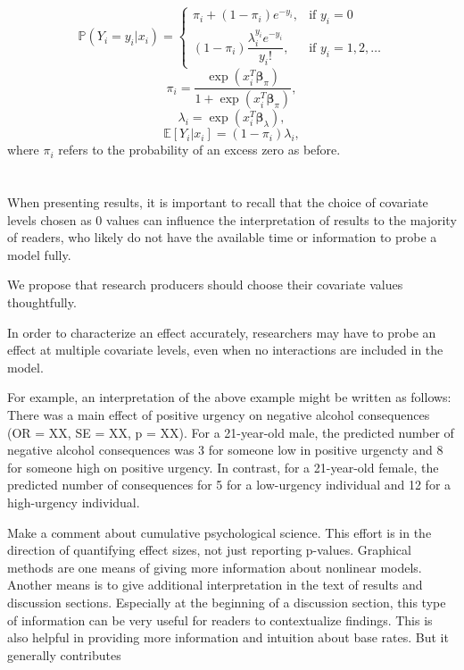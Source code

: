 \documentclass[jou, apacite]{apa6}
\begin{document}
\begin{equation} \label{zip1}
\mathbb{P}(Y_i = y_i|x_i) =
  \begin{cases}
    \pi_i + (1 - \pi_i)e^{-y_i}, & \text{if } y_i = 0 \\
    (1 - \pi_i) \dfrac{\lambda_i^{y_i}e^{-y_i}}{y_i!}, & \text{if } y_i = 1, 2, \dots
  \end{cases}
\end{equation}
\begin{equation} \label{zip2}
\pi_i = \dfrac{\exp (x_i^T \bm{\beta}_{\pi})}{1 + \exp (x_i^T \bm{\beta}_{\pi})},
\end{equation}
\begin{equation} \label{zip3}
\lambda_i = \exp (x_i^T \bm{\beta}_{\lambda}),
\end{equation}
\begin{equation} \label{zip4}
\mathbb{E}[Y_i|x_i] = (1 - \pi_i)\lambda_i,
\end{equation}
where $\pi_i$ refers to the probability of an excess zero as before.


\section{}
When presenting results, it is important to recall that the choice of covariate levels chosen as 0 values can influence the interpretation of results to the majority of readers, who likely do not have the available time or information to probe a model fully. 

We propose that research producers should choose their covariate values thoughtfully. 

In order to characterize an effect accurately, researchers may have to probe an effect at multiple covariate levels, even when no interactions are included in the model.

For example, an interpretation of the above example might be written as follows: There was a main effect of positive urgency on negative alcohol consequences (OR = XX, SE = XX, p = XX). For a 21-year-old male, the predicted number of negative alcohol consequences was 3 for someone low in positive urgencty and 8 for someone high on positive urgency. In contrast, for a 21-year-old female, the predicted number of consequences for 5 for a low-urgency individual and 12 for a high-urgency individual.

Make a comment about cumulative psychological science. This effort is in the direction of quantifying effect sizes, not just reporting p-values. Graphical methods are one means of giving more information about nonlinear models. Another means is to give additional interpretation in the text of results and discussion sections. Especially at the beginning of a discussion section, this type of information can be very useful for readers to contextualize findings. This is also helpful in providing more information and intuition about base rates. But it generally contributes 
\end{document}
